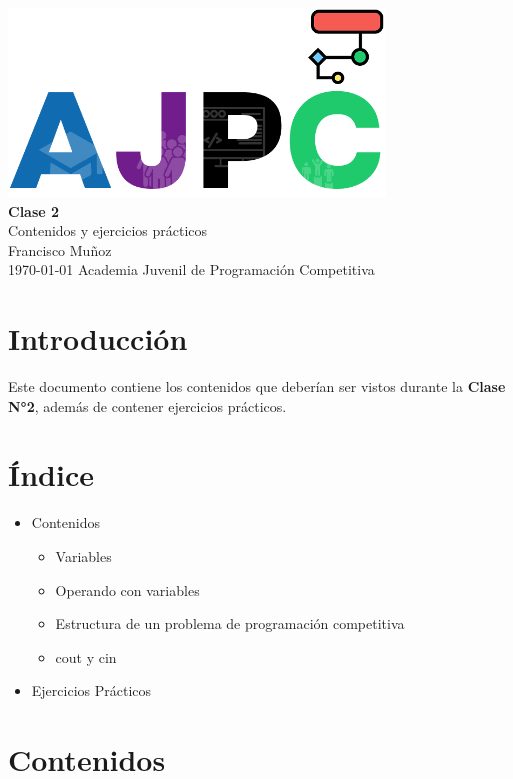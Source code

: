 \documentclass{article}
\newcommand{\documentTitle}{Clase 2}
\newcommand{\documentSubtitle}{Contenidos y ejercicios prácticos}
\newcommand{\documentAuthor}{Francisco Muñoz}
\newcommand{\documentDate}{\today}
\begin{document}
\thispagestyle{empty}
\AddToShipoutPictureBG*{}
\begin{center}
    \vspace*{2cm}
    \includegraphics[width=0.75\textwidth]{logo.png} \\[1.5cm]
    {\Huge \textbf{\documentTitle}} \\[0.5cm]
    {\Large \documentSubtitle} \\[1.5cm]
    {\large \documentAuthor} \\[0.5cm]
    {\large \space \space \documentDate}
    \vfill
    {\large Academia Juvenil de Programación Competitiva}
\end{center}
\newpage

\section{Introducción}

Este documento contiene los contenidos que deberían ser vistos durante la \textbf{Clase N°2}, además de contener ejercicios prácticos.

\section{Índice}

\begin{itemize}
    \item Contenidos
    \begin{itemize}
        \item Variables
        \item Operando con variables
        \item Estructura de un problema de programación competitiva
        \item cout y cin
    \end{itemize}
    \item Ejercicios Prácticos
\end{itemize}

\section{Contenidos}
\end{document}

